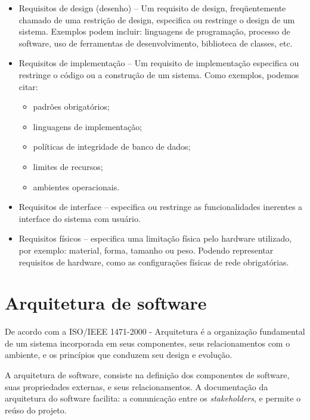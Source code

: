 \begin{itemize}
\item Requisitos de design (desenho) – Um requisito de design, freqüentemente chamado de uma restrição de design, especifica ou restringe o design de um sistema. Exemplos podem incluir: linguagens de programação, processo de software, uso de ferramentas de desenvolvimento, biblioteca de classes, etc.
\item Requisitos de implementação – Um requisito de implementação especifica ou restringe o código ou a construção de um sistema. Como exemplos, podemos citar:
\begin{itemize}

  \item padrões obrigatórios;
  \item linguagens de implementação;
  \item políticas de integridade de banco de dados;
  \item limites de recursos;
  \item ambientes operacionais.

\end{itemize}
\item Requisitos de interface – especifica ou restringe as funcionalidades inerentes a interface do sistema com usuário.
\item Requisitos físicos – especifica uma limitação física pelo hardware utilizado, por exemplo: material, forma, tamanho ou peso. Podendo representar requisitos de hardware, como as configurações físicas de rede obrigatórias.
\end{itemize}
\cite{rational}
  \section{Arquitetura de software}
  \label{Sec:arquitetura}
    De acordo com a ISO/IEEE 1471-2000 - Arquitetura é a organização fundamental
  de um sistema incorporada em seus componentes, seus relacionamentos com o
  ambiente, e os princípios que conduzem seu design e evolução.

    A arquitetura de software, consiste na definição dos componentes de software,
     suas propriedades externas, e seus relacionamentos. A documentação da arquitetura do software
      facilita: a comunicação entre os \textit{stakeholders},
       e permite o reúso do projeto.
